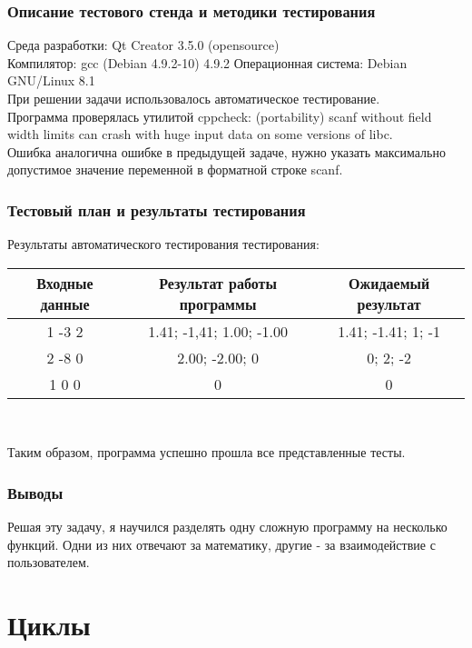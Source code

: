 \documentclass[12pt,a4paper]{report}
\begin{document}
\subsection{Описание тестового стенда и методики тестирования}
Среда разработки: Qt Creator 3.5.0 (opensource)\\
Компилятор: gcc (Debian 4.9.2-10) 4.9.2
Операционная система: Debian GNU/Linux 8.1 \\
При решении задачи использовалось автоматическое тестирование.\\
Программа проверялась утилитой cppcheck: (portability) scanf without field width limits can crash with huge input data on some versions of libc.\\
Ошибка аналогична ошибке в предыдущей задаче, нужно указать максимально допустимое значение переменной в форматной строке scanf. 
\subsection{Тестовый план и результаты тестирования}
\begin{center}
Результаты автоматического тестирования тестирования:
\end{center}
\begin{tabular}{|c|c|c|} 
\hline
Входные данные & Результат работы программы & Ожидаемый результат \\
\hline
1 -3 2 & 1.41; -1,41; 1.00; -1.00 & 1.41; -1.41; 1; -1 \\
\hline
2 -8 0 & 2.00; -2.00; 0 & 0; 2; -2 \\
\hline 
1 0 0 & 0 & 0 \\
\hline
\end{tabular} 
\\
\begin{center}
Таким образом, программа успешно прошла все представленные тесты. 
\end{center}

\subsection{Выводы}
Решая эту задачу, я научился разделять одну сложную программу на несколько функций. Одни из них отвечают за математику, другие - за взаимодействие с пользователем. 
\chapter{Циклы}
\end{document}
